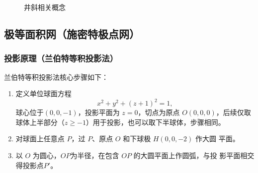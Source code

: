 \documentclass[a4paper,twoside]{ctexart}
\begin{document}
\begin{itemize}
  \begin{figure}[htbp]
  \centering
  \hspace{1cm}
  
  \caption{井斜相关概念}
  \label{fig:井斜相关概念}
\end{figure}
\end{itemize}

\subsection{极等面积网（施密特极点网）}
\label{sec:极等面积网}

\subsubsection{投影原理（兰伯特等积投影法）}
\label{sec:投影原理}

兰伯特等积投影法核心步骤如下： 
\begin{enumerate}[步骤1：]
\item  定义单位球面方程
  \begin{displaymath}
    x^2+y^2+(z+1)^2=1,
  \end{displaymath}
球心位于$(0,0,-1)$，投影平面为 $z=0$，切点为原点 $O(0,0,0)$，后续仅取
球体上半部分（$z\geq -1$）用于投影，也可以取下半球体，步骤相同。 
\item 对球面上任意点 $P$，过 $P$、原点 $O$ 和下球极 $H(0,0,-2)$ 作大圆
  平面。
\item 以 $O$ 为圆心，$OP$为半径，在包含 $OP$ 的大圆平面上作圆弧，与投
  影平面相交得投影点$P'$。
\end{enumerate}
\end{document}
